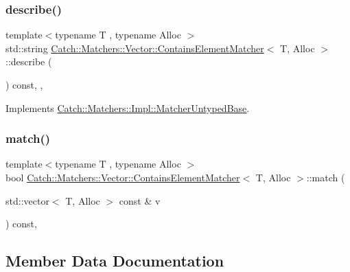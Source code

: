 \subsubsection{\texorpdfstring{describe()}{describe()}}
{\footnotesize\ttfamily template$<$typename T , typename Alloc $>$ \\
std\+::string \mbox{\hyperlink{struct_catch_1_1_matchers_1_1_vector_1_1_contains_element_matcher}{Catch\+::\+Matchers\+::\+Vector\+::\+Contains\+Element\+Matcher}}$<$ T, Alloc $>$\+::describe (\begin{DoxyParamCaption}{ }\end{DoxyParamCaption}) const\hspace{0.3cm}{\ttfamily [inline]}, {\ttfamily [override]}, {\ttfamily [virtual]}}



Implements \mbox{\hyperlink{class_catch_1_1_matchers_1_1_impl_1_1_matcher_untyped_base_a91d3a907dbfcbb596077df24f6e11fe2}{Catch\+::\+Matchers\+::\+Impl\+::\+Matcher\+Untyped\+Base}}.

\mbox{\label{struct_catch_1_1_matchers_1_1_vector_1_1_contains_element_matcher_ac39745f1d1e2f102121a443fad761de3}} 
\subsubsection{\texorpdfstring{match()}{match()}}
{\footnotesize\ttfamily template$<$typename T , typename Alloc $>$ \\
bool \mbox{\hyperlink{struct_catch_1_1_matchers_1_1_vector_1_1_contains_element_matcher}{Catch\+::\+Matchers\+::\+Vector\+::\+Contains\+Element\+Matcher}}$<$ T, Alloc $>$\+::match (\begin{DoxyParamCaption}\item[{std\+::vector$<$ T, Alloc $>$ const \&}]{v }\end{DoxyParamCaption}) const\hspace{0.3cm}{\ttfamily [inline]}, {\ttfamily [override]}}



\subsection{Member Data Documentation}
\mbox{\label{struct_catch_1_1_matchers_1_1_vector_1_1_contains_element_matcher_adecd94fee58a2fea0fc6d4d62a7a95ee}} 
